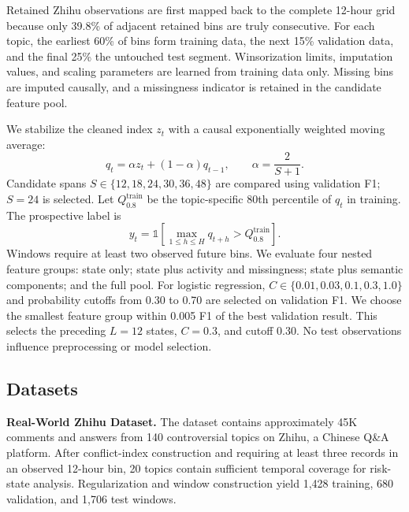 \documentclass[11pt,a4paper]{article}
\begin{document}
Retained Zhihu observations are first mapped back to the complete 12-hour grid because only 39.8\% of adjacent retained bins are truly consecutive. For each topic, the earliest 60\% of bins form training data, the next 15\% validation data, and the final 25\% the untouched test segment. Winsorization limits, imputation values, and scaling parameters are learned from training data only. Missing bins are imputed causally, and a missingness indicator is retained in the candidate feature pool.

We stabilize the cleaned index $z_t$ with a causal exponentially weighted moving average:
\begin{equation}
q_t=\alpha z_t+(1-\alpha)q_{t-1},\qquad \alpha=\frac{2}{S+1}.
\label{eq:ewma}
\end{equation}
Candidate spans $S\in\{12,18,24,30,36,48\}$ are compared using validation F1; $S=24$ is selected. Let $Q_{0.8}^{\mathrm{train}}$ be the topic-specific 80th percentile of $q_t$ in training. The prospective label is
\begin{equation}
y_t=\mathbb{1}\!\left[\max_{1\le h\le H}q_{t+h}>Q_{0.8}^{\mathrm{train}}\right].
\label{eq:risk_label}
\end{equation}
Windows require at least two observed future bins. We evaluate four nested feature groups: state only; state plus activity and missingness; state plus semantic components; and the full pool. For logistic regression, $C\in\{0.01,0.03,0.1,0.3,1.0\}$ and probability cutoffs from 0.30 to 0.70 are selected on validation F1. We choose the smallest feature group within 0.005 F1 of the best validation result. This selects the preceding $L=12$ states, $C=0.3$, and cutoff 0.30. No test observations influence preprocessing or model selection.

\subsection{Datasets}

\textbf{Real-World Zhihu Dataset.} The dataset contains approximately 45K comments and answers from 140 controversial topics on Zhihu, a Chinese Q\&A platform. After conflict-index construction and requiring at least three records in an observed 12-hour bin, 20 topics contain sufficient temporal coverage for risk-state analysis. Regularization and window construction yield 1,428 training, 680 validation, and 1,706 test windows.
\end{document}
